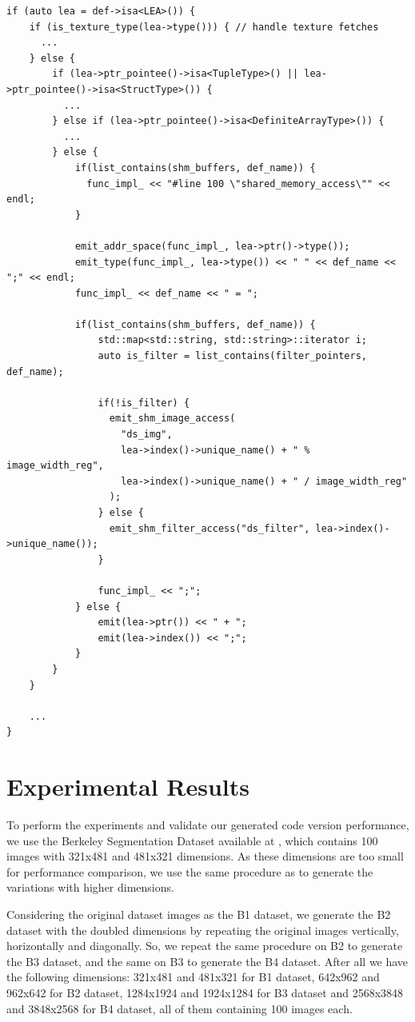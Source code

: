 \documentclass{article}
\begin{document}
\begin{verbatim}
if (auto lea = def->isa<LEA>()) {
    if (is_texture_type(lea->type())) { // handle texture fetches
      ...
    } else {
        if (lea->ptr_pointee()->isa<TupleType>() || lea->ptr_pointee()->isa<StructType>()) {
          ...
        } else if (lea->ptr_pointee()->isa<DefiniteArrayType>()) {
          ...
        } else {
            if(list_contains(shm_buffers, def_name)) {
              func_impl_ << "#line 100 \"shared_memory_access\"" << endl;
            }

            emit_addr_space(func_impl_, lea->ptr()->type());
            emit_type(func_impl_, lea->type()) << " " << def_name << ";" << endl;
            func_impl_ << def_name << " = ";

            if(list_contains(shm_buffers, def_name)) {
                std::map<std::string, std::string>::iterator i;
                auto is_filter = list_contains(filter_pointers, def_name);

                if(!is_filter) {
                  emit_shm_image_access(
                    "ds_img",
                    lea->index()->unique_name() + " % image_width_reg",
                    lea->index()->unique_name() + " / image_width_reg"
                  );
                } else {
                  emit_shm_filter_access("ds_filter", lea->index()->unique_name());
                }

                func_impl_ << ";"; 
            } else { 
                emit(lea->ptr()) << " + ";
                emit(lea->index()) << ";"; 
            }
        }
    }

    ...
}
\end{verbatim}

\section{Experimental Results}

To perform the experiments and validate our generated code version performance, we use the Berkeley Segmentation Dataset \cite{dataset} available at \cite{dataseturl}, which contains 100 images with 321x481 and 481x321 dimensions. As these dimensions are too small for performance comparison, we use the same procedure as \cite{luislourenco} to generate the variations with higher dimensions.

Considering the original dataset images as the B1 dataset, we generate the B2 dataset with the doubled dimensions by repeating the original images vertically, horizontally and diagonally. So, we repeat the same procedure on B2 to generate the B3 dataset, and the same on B3 to generate the B4 dataset. After all we have the following dimensions: 321x481 and 481x321 for B1 dataset, 642x962 and 962x642 for B2 dataset, 1284x1924 and 1924x1284 for B3 dataset and 2568x3848 and 3848x2568 for B4 dataset, all of them containing 100 images each.
\end{document}
